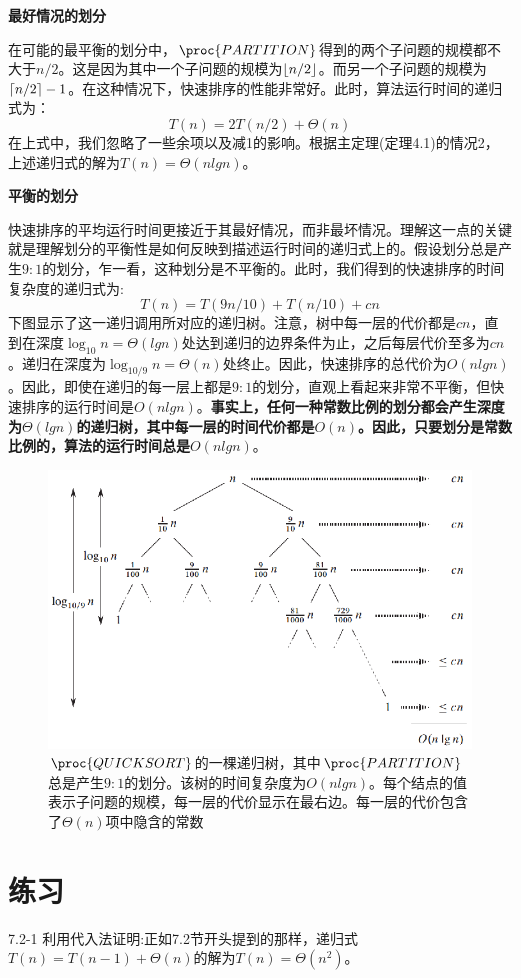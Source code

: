 \documentclass[a4paper,11pt]{ctexbook}
\begin{document}
\textbf{最好情况的划分}

在可能的最平衡的划分中，$ \proc{PARTITION} $得到的两个子问题的规模都不大于$ n/2 $。这是因为其中一个子问题的规模为$ \left\lfloor n/2 \right\rfloor $。而另一个子问题的规模为$ \lceil n/2 \rceil-1 $。在这种情况下，快速排序的性能非常好。此时，算法运行时间的递归式为：
\[
	T(n)=2T(n/2)+\Theta(n)
\]
在上式中，我们忽略了一些余项以及减1的影响。根据主定理(定理4.1)的情况2，上述递归式的解为$ T(n)=\Theta(nlgn) $。

\textbf{平衡的划分}

快速排序的平均运行时间更接近于其最好情况，而非最坏情况。理解这一点的关键就是理解划分的平衡性是如何反映到描述运行时间的递归式上的。假设划分总是产生$ 9:1 $的划分，乍一看，这种划分是不平衡的。此时，我们得到的快速排序的时间复杂度的递归式为:
\[
	T(n) = T(9n/10) + T(n/10)+cn
\]
下图显示了这一递归调用所对应的递归树。注意，树中每一层的代价都是$ cn $，直到在深度$ \log_{10}{n}=\Theta(lgn) $处达到递归的边界条件为止，之后每层代价至多为$ cn $。递归在深度为$\log_{10/9}{n}=\Theta(n) $处终止。因此，快速排序的总代价为$ O(nlgn) $。因此，即使在递归的每一层上都是$ 9:1 $的划分，直观上看起来非常不平衡，但快速排序的运行时间是$ O(nlgn) $。\textbf{事实上，任何一种常数比例的划分都会产生深度为$ \Theta(lgn) $的递归树，其中每一层的时间代价都是$ O(n) $。因此，只要划分是常数比例的，算法的运行时间总是$ O(nlgn) $}。

\begin{figure}[htbp]	
	\begin{center}
	 \includegraphics{figure/7.4.eps}	
	 \caption{$ \proc{QUICKSORT} $的一棵递归树，其中$ \proc{PARTITION} $总是产生$ 9:1 $的划分。该树的时间复杂度为$ O(nlgn) $。每个结点的值表示子问题的规模，每一层的代价显示在最右边。每一层的代价包含了$ \Theta(n) $项中隐含的常数}
	\end{center}	
\end{figure}

\section*{练习}

7.2-1 利用代入法证明:正如7.2节开头提到的那样，递归式$ T(n) = T(n-1) + \Theta(n) $的解为$ T(n)=\Theta(n^2) $。
\end{document}

